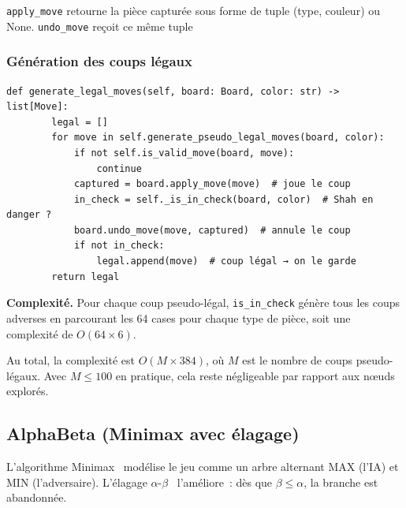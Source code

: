 \documentclass[a4paper,11pt]{article}
\begin{document}
\texttt{apply\_move} retourne la pièce capturée sous forme de tuple 
(type, couleur) ou None. \texttt{undo\_move} reçoit ce même tuple

\subsubsection{Génération des coups légaux}

\begin{verbatim}
def generate_legal_moves(self, board: Board, color: str) -> list[Move]:
        legal = []
        for move in self.generate_pseudo_legal_moves(board, color):
            if not self.is_valid_move(board, move):
                continue
            captured = board.apply_move(move)  # joue le coup
            in_check = self._is_in_check(board, color)  # Shah en danger ?
            board.undo_move(move, captured)  # annule le coup
            if not in_check:
                legal.append(move)  # coup légal → on le garde
        return legal
\end{verbatim}

\noindent\textbf{Complexité.} Pour chaque coup pseudo-légal, \texttt{is\_in\_check} génère 
tous les coups adverses en parcourant les 64 cases pour chaque type de pièce, soit une complexité 
de $O(64 \times 6)$. 

Au total, la complexité est $O(M \times 384)$, où $M$ est le nombre de coups pseudo-légaux.
Avec $M \leq 100$ en pratique, cela reste négligeable par rapport aux nœuds explorés.

\subsection{AlphaBeta (Minimax avec élagage)}

L'algorithme Minimax~\cite{Shannon1950} modélise le jeu comme un arbre
alternant MAX (l'IA) et MIN (l'adversaire). L'élagage $\alpha$-$\beta$~\cite{Knuth1975}
l'améliore~: dès que $\beta \leq \alpha$, la branche est abandonnée.
\end{document}
